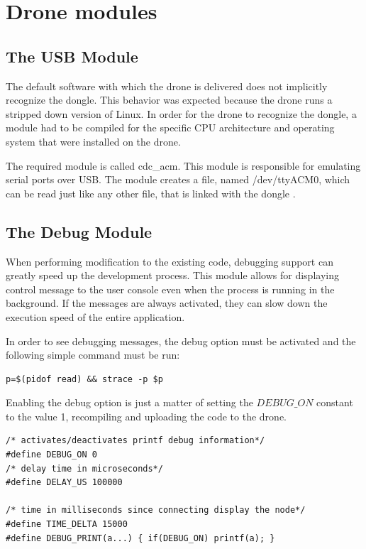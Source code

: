 \section{Drone modules}

\subsection{The USB Module}

The default software with which the drone is delivered does not implicitly recognize the dongle. This behavior was expected because the drone runs a stripped down version of Linux. In order for the drone to recognize the dongle, a module had to be compiled for the specific CPU architecture and operating system that were installed on the drone.

The required module is called cdc\_acm\cite{cdcacm}. This module is responsible for emulating serial ports over USB. The module creates a file, named /dev/ttyACM0, which can be read just like any other file, that is linked with the dongle .

\subsection{The Debug Module}
 
When performing modification to the existing code, debugging support can greatly speed up the development process. This module allows for displaying control message to the user console even when the process is running in the background. If the messages are always activated, they can slow down the execution speed of the entire application.

In order to see debugging messages, the debug option must be activated and the following simple command must be run:

\begin{lstlisting}
p=$(pidof read) && strace -p $p
\end{lstlisting}

Enabling the debug option is just a matter of setting the $DEBUG\_ON$ constant to the value 1, recompiling and uploading the code to the drone.

\lstset{numbers=none, mathescape=true, nolol=false,caption=Debug and timing defines,label=lst:task}
\begin{lstlisting}
/* activates/deactivates printf debug information*/
#define DEBUG_ON 0
/* delay time in microseconds*/
#define DELAY_US 100000

/* time in milliseconds since connecting display the node*/
#define TIME_DELTA 15000
#define DEBUG_PRINT(a...) { if(DEBUG_ON) printf(a); }
\end{lstlisting}

